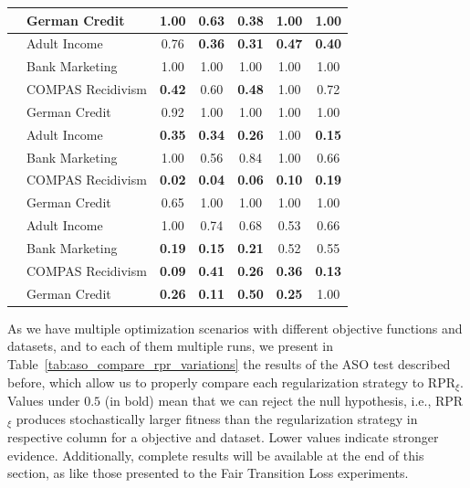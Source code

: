 \begin{table}[ht]
{\begin{tabular}{llccccc}
 & German Credit & 1.00 & 0.63 & \textbf{0.38} & 1.00 & 1.00 \\
\midrule
{} 
 & Adult Income & 0.76 & \textbf{0.36} & \textbf{0.31} & \textbf{0.47} & \textbf{0.40} \\
 & Bank Marketing & 1.00 & 1.00 & 1.00 & 1.00 & 1.00 \\
 & COMPAS Recidivism & \textbf{0.42} & 0.60 & \textbf{0.48} & 1.00 & 0.72 \\
 & German Credit & 0.92 & 1.00 & 1.00 & 1.00 & 1.00 \\
\midrule
{} 
 & Adult Income & \textbf{0.35} & \textbf{0.34} & \textbf{0.26} & 1.00 & \textbf{0.15} \\
 & Bank Marketing & 1.00 & 0.56 & 0.84 & 1.00 & 0.66 \\
 & COMPAS Recidivism & \textbf{0.02} & \textbf{0.04} & \textbf{0.06} & \textbf{0.10} & \textbf{0.19} \\
 & German Credit & 0.65 & 1.00 & 1.00 & 1.00 & 1.00 \\
\midrule
{} 
 & Adult Income & 1.00 & 0.74 & 0.68 & 0.53 & 0.66 \\
 & Bank Marketing & \textbf{0.19} & \textbf{0.15} & \textbf{0.21} & 0.52 & 0.55 \\
 & COMPAS Recidivism & \textbf{0.09} & \textbf{0.41} & \textbf{0.26} & \textbf{0.36} & \textbf{0.13} \\
 & German Credit & \textbf{0.26} & \textbf{0.11} & \textbf{0.50} & \textbf{0.25} & 1.00 \\
\bottomrule
\end{tabular}
    }
\end{table}

As we have multiple optimization scenarios with different objective functions and datasets, and to each of them multiple runs, we present in Table~\ref{tab:aso_compare_rpr_variations} the results of the ASO test described before, which allow us to properly compare each regularization strategy to RPR$_{\xi}$. Values under $0.5$ (in bold) mean that we can reject the null hypothesis, i.e., RPR$_{\xi}$ produces stochastically larger fitness than the regularization strategy in respective column for a objective and dataset. Lower values indicate stronger evidence. Additionally, complete results will be available at the end of this section, as like those presented to the Fair Transition Loss experiments.

